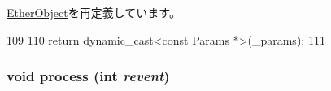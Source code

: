 \hyperlink{classEtherObject_acd3c3feb78ae7a8f88fe0f110a718dff}{EtherObject}を再定義しています。


\begin{DoxyCode}
109     {
110         return dynamic_cast<const Params *>(_params);
111     }
\end{DoxyCode}
\hypertarget{classEtherTap_aedacbaeee0c89ceca526874c34f6b20b}{
\subsubsection[{process}]{\setlength{\rightskip}{0pt plus 5cm}void process (int {\em revent})}}
\label{classEtherTap_aedacbaeee0c89ceca526874c34f6b20b}



